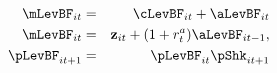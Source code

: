 \begin{eqnarray}
\mLevBF_{it}    &=& \cLevBF_{it} + \aLevBF_{it}  \label{eq:DBCparts} \\
\mLevBF_{it} &=& \mathbf{z}_{it} +   (1 + r^{a}_{t} ) \aLevBF_{it-1}  , \\
\pLevBF_{it+1} &=&\pLevBF_{it} \pShk_{it+1} \\
\end{eqnarray}
